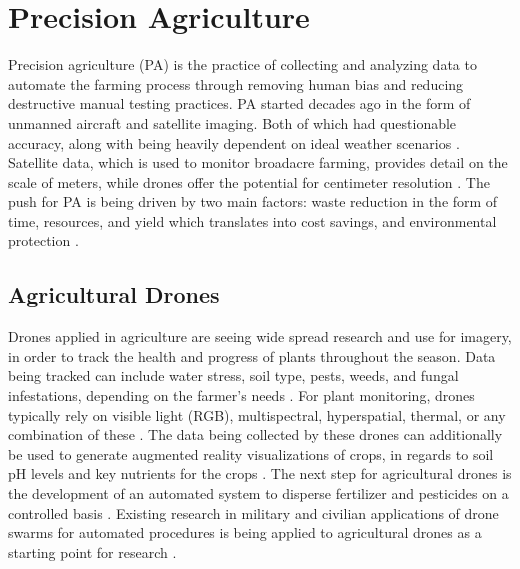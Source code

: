 \documentclass{IEEEtran}
\begin{document}

\section{Precision Agriculture}
Precision agriculture (PA) is the practice of collecting and analyzing data to automate the farming process through removing human bias and reducing destructive manual testing practices. PA started decades ago
in the form of unmanned aircraft and satellite imaging. Both of which had questionable accuracy, along with being heavily dependent on ideal weather scenarios \cite{key9}. Satellite data, which is used
to monitor broadacre farming, provides detail on the scale of meters, while drones offer the potential for centimeter resolution \cite{key8}. The push for PA is being driven by two main factors: waste reduction in the form
of time, resources, and yield which translates into cost savings, and environmental protection \cite{key9}.

\subsection{Agricultural Drones}
Drones applied in agriculture are seeing wide spread research and use for imagery, in order to track the health and progress of plants throughout the season.
Data being tracked can include water stress, soil type, pests, weeds, and fungal infestations, depending on the farmer’s needs \cite{key9}.
For plant monitoring, drones typically rely on visible light (RGB), multispectral, hyperspatial, thermal, or any combination of these \cite{key7} \cite{key8} \cite{key9}.
The data being collected by these drones can additionally be used to generate augmented reality visualizations of crops, in regards to soil pH levels and key nutrients for
the crops \cite{key7}. The next step for agricultural drones is the development of an automated system to disperse fertilizer and pesticides on a controlled basis \cite{key9}.
Existing research in military and civilian applications of drone swarms for automated procedures is being applied to agricultural drones as a starting point for research \cite{key4}. 
\end{document}
